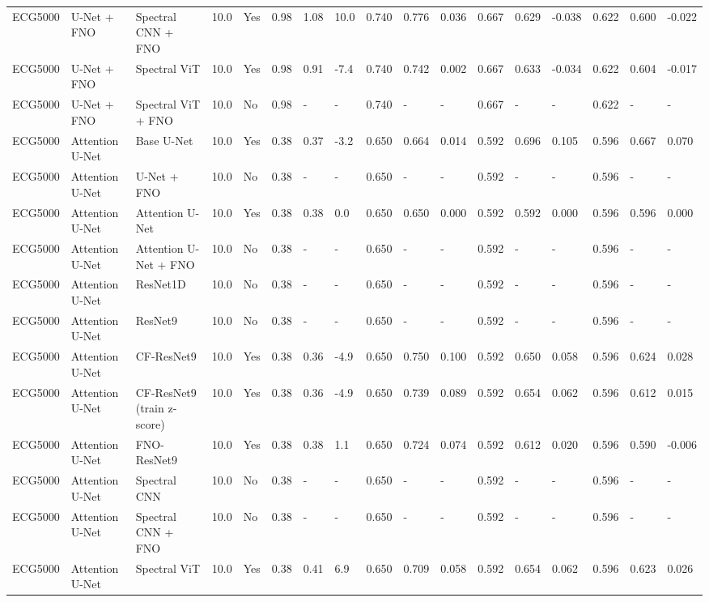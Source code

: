 \begin{longtable}{lllllllllllllllll}
ECG5000 & U-Net + FNO & Spectral CNN + FNO & 10.0 & Yes & 0.98 & 1.08 & 10.0 & 0.740 & 0.776 & 0.036 & 0.667 & 0.629 & -0.038 & 0.622 & 0.600 & -0.022 \\
ECG5000 & U-Net + FNO & Spectral ViT & 10.0 & Yes & 0.98 & 0.91 & -7.4 & 0.740 & 0.742 & 0.002 & 0.667 & 0.633 & -0.034 & 0.622 & 0.604 & -0.017 \\
ECG5000 & U-Net + FNO & Spectral ViT + FNO & 10.0 & No & 0.98 & - & - & 0.740 & - & - & 0.667 & - & - & 0.622 & - & - \\
ECG5000 & Attention U-Net & Base U-Net & 10.0 & Yes & 0.38 & 0.37 & -3.2 & 0.650 & 0.664 & 0.014 & 0.592 & 0.696 & 0.105 & 0.596 & 0.667 & 0.070 \\
ECG5000 & Attention U-Net & U-Net + FNO & 10.0 & No & 0.38 & - & - & 0.650 & - & - & 0.592 & - & - & 0.596 & - & - \\
ECG5000 & Attention U-Net & Attention U-Net & 10.0 & Yes & 0.38 & 0.38 & 0.0 & 0.650 & 0.650 & 0.000 & 0.592 & 0.592 & 0.000 & 0.596 & 0.596 & 0.000 \\
ECG5000 & Attention U-Net & Attention U-Net + FNO & 10.0 & No & 0.38 & - & - & 0.650 & - & - & 0.592 & - & - & 0.596 & - & - \\
ECG5000 & Attention U-Net & ResNet1D & 10.0 & No & 0.38 & - & - & 0.650 & - & - & 0.592 & - & - & 0.596 & - & - \\
ECG5000 & Attention U-Net & ResNet9 & 10.0 & No & 0.38 & - & - & 0.650 & - & - & 0.592 & - & - & 0.596 & - & - \\
ECG5000 & Attention U-Net & CF-ResNet9 & 10.0 & Yes & 0.38 & 0.36 & -4.9 & 0.650 & 0.750 & 0.100 & 0.592 & 0.650 & 0.058 & 0.596 & 0.624 & 0.028 \\
ECG5000 & Attention U-Net & CF-ResNet9 (train z-score) & 10.0 & Yes & 0.38 & 0.36 & -4.9 & 0.650 & 0.739 & 0.089 & 0.592 & 0.654 & 0.062 & 0.596 & 0.612 & 0.015 \\
ECG5000 & Attention U-Net & FNO-ResNet9 & 10.0 & Yes & 0.38 & 0.38 & 1.1 & 0.650 & 0.724 & 0.074 & 0.592 & 0.612 & 0.020 & 0.596 & 0.590 & -0.006 \\
ECG5000 & Attention U-Net & Spectral CNN & 10.0 & No & 0.38 & - & - & 0.650 & - & - & 0.592 & - & - & 0.596 & - & - \\
ECG5000 & Attention U-Net & Spectral CNN + FNO & 10.0 & No & 0.38 & - & - & 0.650 & - & - & 0.592 & - & - & 0.596 & - & - \\
ECG5000 & Attention U-Net & Spectral ViT & 10.0 & Yes & 0.38 & 0.41 & 6.9 & 0.650 & 0.709 & 0.058 & 0.592 & 0.654 & 0.062 & 0.596 & 0.623 & 0.026 \\

\end{longtable}
